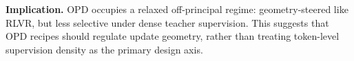 \documentclass{llmxive}
\begin{document}
\begin{takeawaybox}
\textbf{Implication.}
OPD occupies a relaxed off-principal regime: geometry-steered like RLVR,
but less selective under dense teacher supervision. This suggests that OPD recipes should regulate update geometry, rather than treating token-level supervision density as the primary design axis.
\end{takeawaybox}






\end{document}
